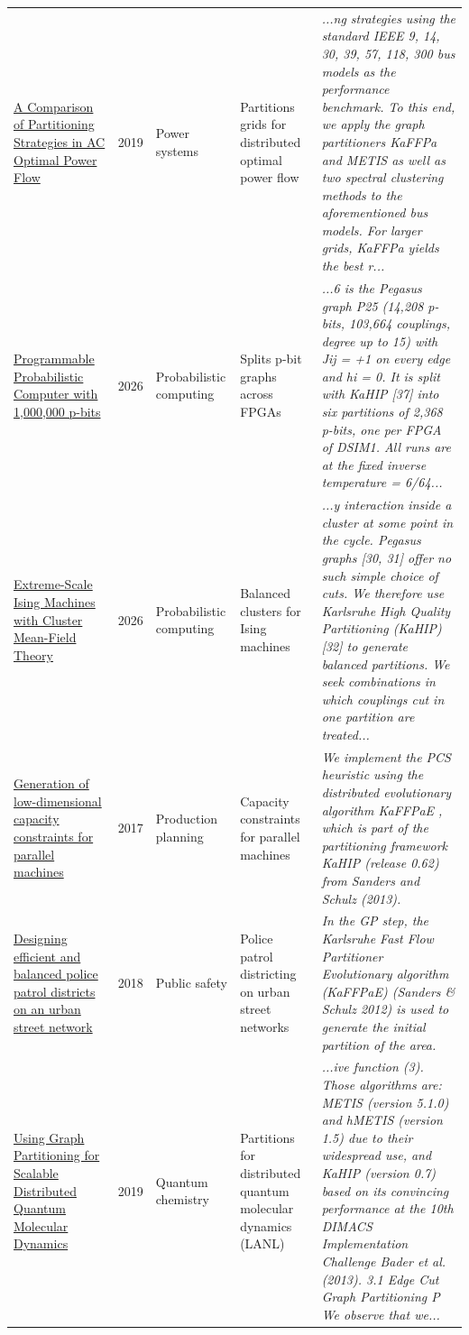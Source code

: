 \documentclass[9pt]{extarticle}
\begin{document}
\begin{longtable}{@{}>{\raggedright}p{6.6cm}r>{\raggedright}p{2.9cm}>{\raggedright}p{4.6cm}>{\raggedright\arraybackslash}p{8.4cm}@{}}
\href{https://doi.org/10.48550/arxiv.1911.11516}{A Comparison of Partitioning Strategies in AC Optimal Power Flow} & 2019 & Power systems & Partitions grids for distributed optimal power flow & {\footnotesize\itshape ...ng strategies using the standard IEEE 9, 14, 30, 39, 57, 118, 300 bus models as the performance benchmark. To this end, we apply the graph partitioners KaFFPa and METIS as well as two spectral clustering methods to the aforementioned bus models. For larger grids, KaFFPa yields the best r...}\\
\href{https://doi.org/10.48550/arxiv.2606.25313}{Programmable Probabilistic Computer with 1,000,000 p-bits} & 2026 & Probabilistic computing & Splits p-bit graphs across FPGAs & {\footnotesize\itshape ...6 is the Pegasus graph P25 (14,208 p-bits, 103,664 couplings, degree up to 15) with Jij = +1 on every edge and hi = 0. It is split with KaHIP [37] into six partitions of 2,368 p-bits, one per FPGA of DSIM1. All runs are at the fixed inverse temperature  = 6/64...}\\
\href{https://doi.org/10.48550/arxiv.2609.22645}{Extreme-Scale Ising Machines with Cluster Mean-Field Theory} & 2026 & Probabilistic computing & Balanced clusters for Ising machines & {\footnotesize\itshape ...y interaction inside a cluster at some point in the cycle. Pegasus graphs [30, 31] offer no such simple choice of cuts. We therefore use Karlsruhe High Quality Partitioning (KaHIP) [32] to generate balanced partitions. We seek combinations in which couplings cut in one partition are treated...}\\
\href{https://doi.org/10.1080/24725854.2017.1364875}{Generation of low-dimensional capacity constraints for parallel machines} & 2017 & Production planning & Capacity constraints for parallel machines & {\footnotesize\itshape We implement the PCS heuristic using the distributed evolutionary algorithm KaFFPaE , which is part of the partitioning framework KaHIP (release 0.62) from Sanders and Schulz (2013).}\\
\href{https://doi.org/10.1080/13658816.2018.1525493}{Designing efficient and balanced police patrol districts on an urban street network} & 2018 & Public safety & Police patrol districting on urban street networks & {\footnotesize\itshape In the GP step, the Karlsruhe Fast Flow Partitioner Evolutionary algorithm (KaFFPaE) (Sanders \& Schulz 2012) is used to generate the initial partition of the area.}\\
\href{https://doi.org/10.3390/a12090187}{Using Graph Partitioning for Scalable Distributed Quantum Molecular Dynamics} & 2019 & Quantum chemistry & Partitions for distributed quantum molecular dynamics (LANL) & {\footnotesize\itshape ...ive function (3). Those algorithms are: METIS (version 5.1.0) and hMETIS (version 1.5) due to their widespread use, and KaHIP (version 0.7) based on its convincing performance at the 10th DIMACS Implementation Challenge Bader et al. (2013). 3.1 Edge Cut Graph Partitioning P We observe that we...}\\

\end{longtable}
\end{document}
